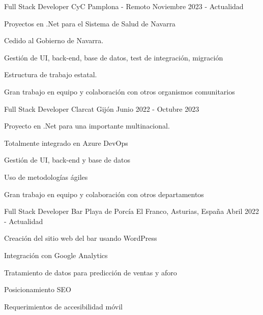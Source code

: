 

\begin{cventries}
    \cventry
    {Full Stack Developer} %
    {CyC} %
    {Pamplona - Remoto} %
    {Noviembre 2023 - Actualidad} %
    {
        \begin{cvitems} %
            \item {Proyectos en .Net para el Sistema de Salud de Navarra}
            \item {Cedido al Gobierno de Navarra.}
            \item {Gestión de UI, back-end, base de datos, test de integración, migración}
            \item {Estructura de trabajo estatal.}
            \item {Gran trabajo en equipo y colaboración con otros organismos comunitarios}
        \end{cvitems}
    }
    \cventry
    {Full Stack Developer} %
    {Clarcat} %
    {Gijón} %
    {Junio 2022 - Octubre 2023} %
    {
        \begin{cvitems} %
            \item {Proyecto en .Net para una importante multinacional.}
            \item {Totalmente integrado en Azure DevOps}
            \item {Gestión de UI, back-end y base de datos}
            \item {Uso de metodologías ágiles}
            \item {Gran trabajo en equipo y colaboración con otros departamentos}
        \end{cvitems}
    }
    \cventry
    {Full Stack Developer} %
    {Bar Playa de Porcía} %
    {El Franco, Asturias, España} %
    {Abril 2022 - Actualidad} %
    {
        \begin{cvitems} %
            \item {Creación del sitio web del bar usando WordPress}
            \item {Integración con Google Analytics}
            \item {Tratamiento de datos para predicción de ventas y aforo}
            \item {Posicionamiento SEO}
            \item {Requerimientos de accesibilidad móvil}
        \end{cvitems}
    }


\end{cventries}
